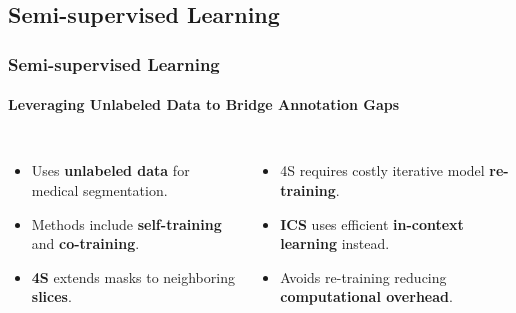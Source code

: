 \documentclass[nometaot,lecture,amberg,toc=twocolumn,indicatelastpageofframe,footlinebox]{OTHAWbeamer}
\begin{document}
\subsection{Semi-supervised Learning}
\begin{frame}[label=relworks2]
    \frametitle{Semi-supervised Learning}
    \framesubtitle{Leveraging Unlabeled Data to Bridge Annotation Gaps}

    \begin{columns}[T]
            \vspace{0.3cm}
            \begin{itemize}\small
                \item Uses \textbf{\textcolor{orange1}{unlabeled data}} for medical segmentation.

                \vspace{0.4em}
                \item Methods include \textbf{\textcolor{orange1}{self-training}} and \textbf{\textcolor{orange1}{co-training}}.

                \vspace{0.4em}
                \item \textbf{\textcolor{orange1}{4S}} extends masks to neighboring \textbf{\textcolor{orange1}{slices}}.
            \end{itemize}

            \vspace{0.3cm}
            \begin{itemize}\small
                \item 4S requires costly iterative model \textbf{\textcolor{orange1}{re-training}}.

                \vspace{0.4em}
                \item \textbf{\textcolor{orange1}{ICS}} uses efficient \textbf{\textcolor{orange1}{in-context learning}} instead.

                \vspace{0.4em}
                \item Avoids re-training reducing \textbf{\textcolor{orange1}{computational overhead}}.
            \end{itemize}

    \end{columns}

\end{frame}
\end{document}
